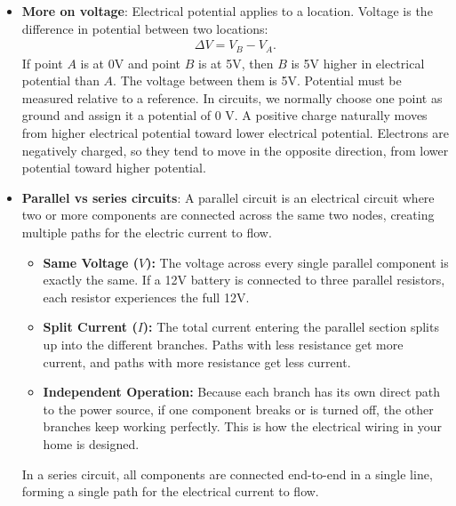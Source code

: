 \documentclass{report}
\begin{document}
\begin{itemize}
\begin{align*}
            .\end{align*}
            Its unit is the volt
            \begin{align*}
                V = \frac{J}{C}
            .\end{align*}
        \item \textbf{More on voltage}: Electrical potential applies to a location. Voltage is the difference in potential between two locations:
            \begin{align*}
                \Delta V = V_{B} - V_{A}
            .\end{align*}
            If point $A$ is at 0V and point $B$ is at 5V, then $B$ is 5V higher in electrical potential than $A$. The voltage between them is 5V.
            \bigbreak \noindent 
            Potential must be measured relative to a reference. In circuits, we normally choose one point as ground and assign it a potential of 0 V.
            \bigbreak \noindent 
            A positive charge naturally moves from higher electrical potential toward lower electrical potential. Electrons are negatively charged, so they tend to move in the opposite direction, from lower potential toward higher potential.
        \item \textbf{Parallel vs series circuits}: A parallel circuit is an electrical circuit where two or more components are connected across the same two nodes, creating multiple paths for the electric current to flow.
            \begin{itemize}
                \item \textbf{Same Voltage ($V$):} The voltage across every single parallel component is exactly the same. If a 12V battery is connected to three parallel resistors, each resistor experiences the full 12V.
                \item \textbf{Split Current (\(I\)):} The total current entering the parallel section splits up into the different branches. Paths with less resistance get more current, and paths with more resistance get less current.
                \item \textbf{Independent Operation:} Because each branch has its own direct path to the power source, if one component breaks or is turned off, the other branches keep working perfectly. This is how the electrical wiring in your home is designed.
            \end{itemize}
            In a series circuit, all components are connected end-to-end in a single line, forming a single path for the electrical current to flow.

\end{itemize}
\end{document}
